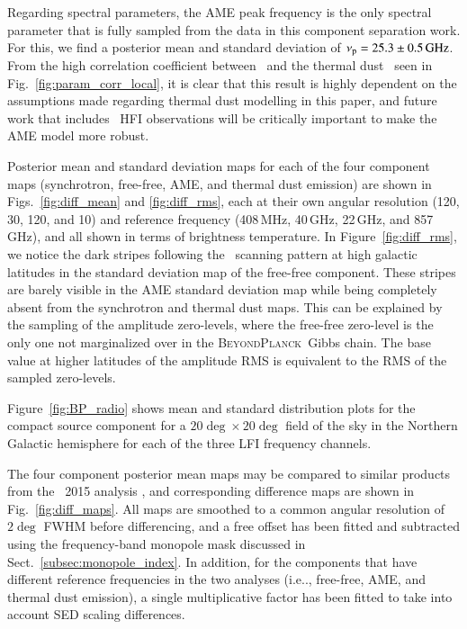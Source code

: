 \documentclass[twocolumn]{aa}
\newcommand{\BP}{\textsc{BeyondPlanck}}
\begin{document}
Regarding spectral parameters, the AME peak frequency is the only
spectral parameter that is fully sampled from the data in this
component separation work. For this, we find a posterior mean and
standard deviation of $\nup = 25.3\pm0.5\GHz$.  From the high
correlation coefficient between \nup\ and the thermal dust
\bdust\ seen in Fig.~\ref{fig:param_corr_local}, it is clear that this
result is highly dependent on the assumptions made regarding thermal
dust modelling in this paper, and future work that includes
\Planck\ HFI observations will be critically important to make the AME
model more robust.

Posterior mean and standard deviation maps for each of the four
component maps (synchrotron, free-free, AME, and thermal dust
emission) are shown in Figs.~\ref{fig:diff_mean} and
\ref{fig:diff_rms}, each at their own angular resolution (120, 30, 120,
and 10\arcm) and reference frequency (408\,MHz, 40\,GHz, 22\,GHz, and
857\,GHz), and all shown in terms of brightness
temperature. In Figure~\ref{fig:diff_rms}, we notice the dark stripes
following the \Planck\ scanning pattern at high galactic latitudes
in the standard deviation map of the free-free component.
These stripes are barely visible in the AME standard deviation map
while being completely absent from the synchrotron and thermal dust maps.
This can be explained by the sampling of the amplitude zero-levels,
where the free-free zero-level is the only one not marginalized over
in the \BP\ Gibbs chain. The base value at higher latitudes of the
amplitude RMS is equivalent to the RMS of the sampled zero-levels.  

Figure~\ref{fig:BP_radio} shows mean and standard distribution
plots for the compact source component for a $20\deg\times20\deg$ field of the sky
in the Northern Galactic hemisphere for each of the three LFI
frequency channels.

The four component posterior mean maps may be compared to similar
products from the \Planck\ 2015 analysis \citep{planck2014-a12}, and
corresponding difference maps are shown in
Fig.~\ref{fig:diff_maps}. All maps are smoothed to a common angular
resolution of $2\deg$ FWHM before differencing, and a free offset has
been fitted and subtracted using the frequency-band monopole mask discussed in
Sect.~\ref{subsec:monopole_index}. In addition, for the components
that have different reference frequencies in the two analyses (i.e..,
free-free, AME, and thermal dust emission), a single multiplicative
factor has been fitted to take into account SED scaling differences.
\end{document}
